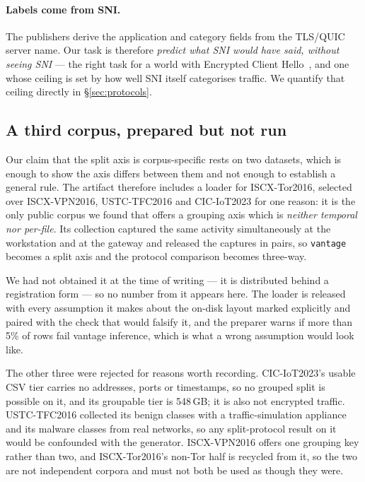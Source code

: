 \paragraph{Labels come from SNI.} The publishers derive the application and
category fields from the TLS/QUIC server name. Our task is therefore
\emph{predict what SNI would have said, without seeing SNI} --- the right task
for a world with Encrypted Client Hello~\cite{rescorla2024ech}, and one whose
ceiling is set by how well SNI itself categorises traffic. We quantify that
ceiling directly in \S\ref{sec:protocols}.

\subsection{A third corpus, prepared but not run}

Our claim that the split axis is corpus-specific rests on two datasets, which
is enough to show the axis differs between them and not enough to establish a
general rule. The artifact therefore includes a loader for ISCX-Tor2016,
selected over ISCX-VPN2016, USTC-TFC2016 and CIC-IoT2023 for one reason: it is
the only public corpus we found that offers a grouping axis which is
\emph{neither temporal nor per-file}. Its collection captured the same activity
simultaneously at the workstation and at the gateway and released the captures
in pairs, so \texttt{vantage} becomes a split axis and the protocol comparison
becomes three-way.

We had not obtained it at the time of writing --- it is distributed behind a
registration form --- so no number from it appears here. The loader is released
with every assumption it makes about the on-disk layout marked explicitly and
paired with the check that would falsify it, and the preparer warns if more
than 5\% of rows fail vantage inference, which is what a wrong assumption would
look like.

The other three were rejected for reasons worth recording. CIC-IoT2023's usable
CSV tier carries no addresses, ports or timestamps, so no grouped split is
possible on it, and its groupable tier is 548\,GB; it is also not encrypted
traffic. USTC-TFC2016 collected its benign classes with a traffic-simulation
appliance and its malware classes from real networks, so any split-protocol
result on it would be confounded with the generator. ISCX-VPN2016 offers one
grouping key rather than two, and ISCX-Tor2016's non-Tor half is recycled from
it, so the two are not independent corpora and must not both be used as though
they were.

